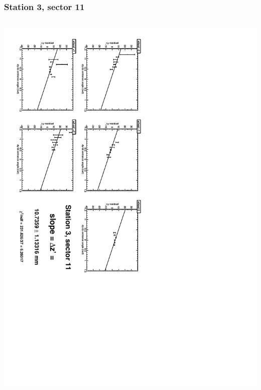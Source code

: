 \documentclass[compress]{beamer}
\begin{document}
\begin{frame}
\frametitle{Station 3, sector 11}
\begin{columns}
\includegraphics[height=\linewidth, angle=90]{zfits/zfit_3_11.pdf}


\end{columns}
\end{frame}
\end{document}
